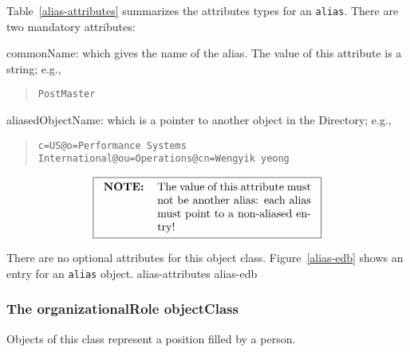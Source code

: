 Table~\ref{alias-attributes} summarizes the attributes types for
an \verb"alias".
There are two mandatory attributes:
\begin{describe}
\item[commonName:]
			which gives the name of the alias.
			The value of this attribute is a string; e.g.,
\begin{quote}\small\begin{verbatim}
PostMaster
\end{verbatim}\end{quote}

\item[aliasedObjectName:]
			which is a pointer to another object in the Directory;
			e.g.,
\begin{quote}\tiny\begin{verbatim}
c=US@o=Performance Systems International@ou=Operations@cn=Wengyik yeong
\end{verbatim}\end{quote}
\[\fbox{\begin{tabular}{lp{0.4\textwidth}}
\bf NOTE:&	The value of this attribute must not be another alias:
		each alias must point to a non-aliased entry!
\end{tabular}}\]
\end{describe}
There are no optional attributes for this object class.
Figure~\ref{alias-edb} shows an entry for an \verb"alias" object.
%
	{alias-attributes}
%
	{alias-edb}

\subsubsection	{The organizationalRole objectClass}
Objects of this class represent a position filled by a person.

